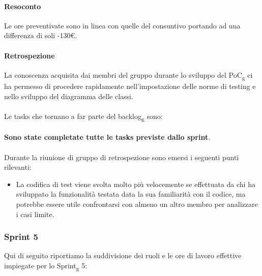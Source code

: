 \paragraph{Resoconto}
Le ore preventivate sono in linea con quelle del consuntivo portando ad una differenza di soli -130\euro.

\paragraph{Retrospezione}
La conoscenza acquisita dai membri del gruppo durante lo sviluppo del PoC\textsubscript{g} ci ha permesso di procedere rapidamente nell'impostazione delle norme di testing e nello sviluppo del diagramma delle classi. 
\\\\
Le tasks che tornano a far parte del backlog\textsubscript{g} sono:
\\\\
\textbf{Sono state completate tutte le tasks previste dallo sprint}.
\\\\
\noindent Durante la riunione di gruppo di retrospezione sono emersi i seguenti punti rilevanti:
\begin{itemize}
	\item La codifica di test viene svolta molto più velocemente se effettuata da chi ha sviluppato la funzionalità testata data la sua familiarità con il codice, ma potrebbe essere utile confrontarsi con almeno un altro membro per analizzare i casi limite.
\end{itemize}\pagebreak


\subsubsection{Sprint 5}
Qui di seguito riportiamo la suddivisione dei ruoli e le ore di lavoro effettive impiegate per lo Sprint\textsubscript{g} 5:

